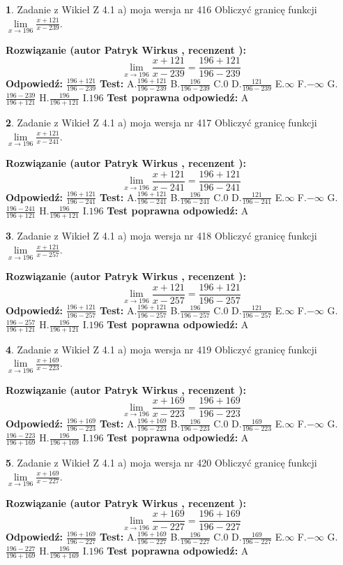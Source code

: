 \documentclass[12pt, a4paper]{article}
\theoremstyle{definition} %
\newtheorem{zad}{}
\newcommand{\zadStart}[1]{\begin{zad}#1\newline}
\newcommand{\zadStop}{\end{zad}}
\newcommand{\rozwStart}[2]{\noindent \textbf{Rozwiązanie (autor #1 , recenzent #2): }\newline}
\newcommand{\rozwStop}{\newline}
\newcommand{\odpStart}{\noindent \textbf{Odpowiedź:}\newline}
\newcommand{\odpStop}{\newline}
\newcommand{\testStart}{\noindent \textbf{Test:}\newline}
\newcommand{\testStop}{\newline}
\newcommand{\kluczStart}{\noindent \textbf{Test poprawna odpowiedź:}\newline}
\newcommand{\kluczStop}{\newline}
\begin{document}
\zadStart{Zadanie z Wikieł Z 4.1 a) moja wersja nr 416}
Obliczyć granicę funkcji $\lim\limits_{x\to196}\frac{x+121}{x-239}$.
\zadStop
\rozwStart{Patryk Wirkus}{}
$$\lim\limits_{x\to196}\frac{x+121}{x-239} = \frac{196+121}{196-239}$$
\rozwStop
\odpStart
$\frac{196+121}{196-239}$
\odpStop
\testStart
A.$\frac{196+121}{196-239}$
B.$\frac{196}{196-239}$
C.$0$
D.$\frac{121}{196-239}$
E.$\infty$
F.$-\infty$
G.$\frac{196-239}{196+121}$
H.$\frac{196}{196+121}$
I.$196$
\testStop
\kluczStart
A
\kluczStop



\zadStart{Zadanie z Wikieł Z 4.1 a) moja wersja nr 417}
Obliczyć granicę funkcji $\lim\limits_{x\to196}\frac{x+121}{x-241}$.
\zadStop
\rozwStart{Patryk Wirkus}{}
$$\lim\limits_{x\to196}\frac{x+121}{x-241} = \frac{196+121}{196-241}$$
\rozwStop
\odpStart
$\frac{196+121}{196-241}$
\odpStop
\testStart
A.$\frac{196+121}{196-241}$
B.$\frac{196}{196-241}$
C.$0$
D.$\frac{121}{196-241}$
E.$\infty$
F.$-\infty$
G.$\frac{196-241}{196+121}$
H.$\frac{196}{196+121}$
I.$196$
\testStop
\kluczStart
A
\kluczStop



\zadStart{Zadanie z Wikieł Z 4.1 a) moja wersja nr 418}
Obliczyć granicę funkcji $\lim\limits_{x\to196}\frac{x+121}{x-257}$.
\zadStop
\rozwStart{Patryk Wirkus}{}
$$\lim\limits_{x\to196}\frac{x+121}{x-257} = \frac{196+121}{196-257}$$
\rozwStop
\odpStart
$\frac{196+121}{196-257}$
\odpStop
\testStart
A.$\frac{196+121}{196-257}$
B.$\frac{196}{196-257}$
C.$0$
D.$\frac{121}{196-257}$
E.$\infty$
F.$-\infty$
G.$\frac{196-257}{196+121}$
H.$\frac{196}{196+121}$
I.$196$
\testStop
\kluczStart
A
\kluczStop



\zadStart{Zadanie z Wikieł Z 4.1 a) moja wersja nr 419}
Obliczyć granicę funkcji $\lim\limits_{x\to196}\frac{x+169}{x-223}$.
\zadStop
\rozwStart{Patryk Wirkus}{}
$$\lim\limits_{x\to196}\frac{x+169}{x-223} = \frac{196+169}{196-223}$$
\rozwStop
\odpStart
$\frac{196+169}{196-223}$
\odpStop
\testStart
A.$\frac{196+169}{196-223}$
B.$\frac{196}{196-223}$
C.$0$
D.$\frac{169}{196-223}$
E.$\infty$
F.$-\infty$
G.$\frac{196-223}{196+169}$
H.$\frac{196}{196+169}$
I.$196$
\testStop
\kluczStart
A
\kluczStop



\zadStart{Zadanie z Wikieł Z 4.1 a) moja wersja nr 420}
Obliczyć granicę funkcji $\lim\limits_{x\to196}\frac{x+169}{x-227}$.
\zadStop
\rozwStart{Patryk Wirkus}{}
$$\lim\limits_{x\to196}\frac{x+169}{x-227} = \frac{196+169}{196-227}$$
\rozwStop
\odpStart
$\frac{196+169}{196-227}$
\odpStop
\testStart
A.$\frac{196+169}{196-227}$
B.$\frac{196}{196-227}$
C.$0$
D.$\frac{169}{196-227}$
E.$\infty$
F.$-\infty$
G.$\frac{196-227}{196+169}$
H.$\frac{196}{196+169}$
I.$196$
\testStop
\kluczStart
A
\kluczStop
\end{document}
